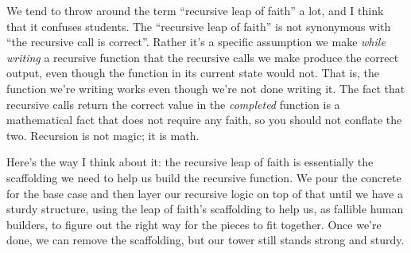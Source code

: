 \begin{meta}
\begin{itemize}
\end{itemize}
We tend to throw around the term ``recursive leap of faith'' a lot, and I think that it confuses students. The ``recursive leap of faith'' is not synonymous with ``the recursive call is correct''. Rather it's a specific assumption we make \textit{while writing} a recursive function that the recursive calls we make produce the correct output, even though the function in its current state would not. That is, the function we're writing works even though we're not done writing it. The fact that recursive calls return the correct value in the \textit{completed} function is a mathematical fact that does not require any faith, so you should not conflate the two. Recursion is not magic; it is math.

Here's the way I think about it: the recursive leap of faith is essentially the scaffolding we need to help us build the recursive function. We pour the concrete for the base case and then layer our recursive logic on top of that until we have a sturdy structure, using the leap of faith's scaffolding to help us, as fallible human builders, to figure out the right way for the pieces to fit together. Once we're done, we can remove the scaffolding, but our tower still stands strong and sturdy. 
\end{meta}
